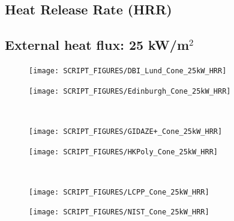 \documentclass{book}
\begin{document}
\begin{landscape}
\section{Heat Release Rate (HRR)}
\label{Cone_HRR}
\subsection{External heat flux: 25 kW/m$^2$}
\begin{minipage}{0.65\textwidth}
\begin{figure}[H]
{\texttt{[image: SCRIPT\_FIGURES/DBI\_Lund\_Cone\_25kW\_HRR]}}\\
\end{figure}
\end{minipage}
\begin{minipage}{0.35\textwidth}
\begin{figure}[H]
{\texttt{[image: SCRIPT\_FIGURES/Edinburgh\_Cone\_25kW\_HRR]}}\\
\end{figure}
\end{minipage}\\
\vfill

\begin{minipage}{0.65\textwidth}
\begin{figure}[H]
{\texttt{[image: SCRIPT\_FIGURES/GIDAZE+\_Cone\_25kW\_HRR]}}\\
\end{figure}
\end{minipage}
\begin{minipage}{0.35\textwidth}
\begin{figure}[H]
{\texttt{[image: SCRIPT\_FIGURES/HKPoly\_Cone\_25kW\_HRR]}}\\
\end{figure}
\end{minipage}\\
\begin{minipage}{0.65\textwidth}
\begin{figure}[H]
{\texttt{[image: SCRIPT\_FIGURES/LCPP\_Cone\_25kW\_HRR]}}\\
\end{figure}
\end{minipage}
\begin{minipage}{0.35\textwidth}
\begin{figure}[H]
{\texttt{[image: SCRIPT\_FIGURES/NIST\_Cone\_25kW\_HRR]}}\\
\end{figure}
\end{minipage}
\vfill


\end{landscape}
\end{document}

